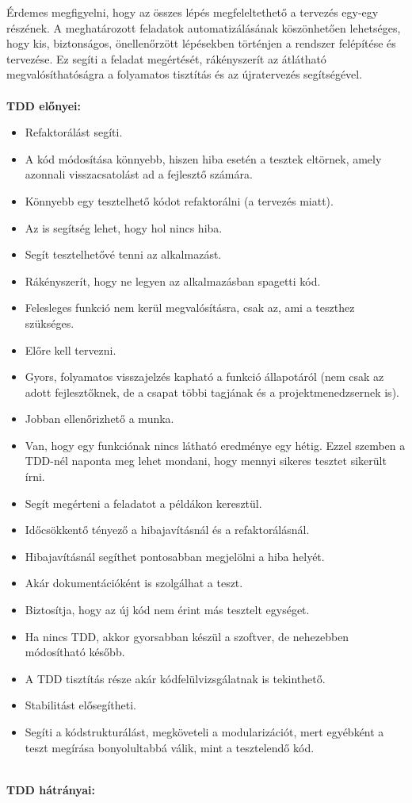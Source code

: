 Érdemes megfigyelni, hogy az összes lépés megfeleltethető a tervezés egy-egy részének. A meghatározott feladatok automatizálásának köszönhetően lehetséges, hogy kis, biztonságos, önellenőrzött lépésekben történjen a rendszer felépítése és tervezése. Ez segíti a feladat megértését, rákényszerít az átlátható megvalósíthatóságra a folyamatos tisztítás és az újratervezés segítségével.\\
\hfill\\
\textbf{TDD előnyei:}

\begin{itemize}
\item Refaktorálást segíti.
\item A kód módosítása könnyebb, hiszen hiba esetén a tesztek eltörnek, amely azonnali visszacsatolást ad a fejlesztő számára.
\item Könnyebb egy tesztelhető kódot refaktorálni (a tervezés miatt).
\item Az is segítség lehet, hogy hol nincs hiba.
\item Segít tesztelhetővé tenni az alkalmazást.
\item Rákényszerít, hogy ne legyen az alkalmazásban spagetti kód.
\item Felesleges funkció nem kerül megvalósításra, csak az, ami a teszthez szükséges.
\item Előre kell tervezni.
\item Gyors, folyamatos visszajelzés kapható a funkció állapotáról (nem csak az adott fejlesztőknek, de a csapat többi tagjának és a projektmenedzsernek is).
\item Jobban ellenőrizhető a munka.
\item Van, hogy egy funkciónak nincs látható eredménye egy hétig. Ezzel szemben a TDD-nél naponta meg lehet mondani, hogy mennyi sikeres tesztet sikerült írni.
\item Segít megérteni a feladatot a példákon keresztül.
\item Időcsökkentő tényező a hibajavításnál és a refaktorálásnál.
\item Hibajavításnál segíthet pontosabban megjelölni a hiba helyét.
\item Akár dokumentációként is szolgálhat a teszt.
\item Biztosítja, hogy az új kód nem érint más tesztelt egységet.
\item Ha nincs TDD, akkor gyorsabban készül a szoftver, de nehezebben módosítható később.
\item A TDD tisztítás része akár kódfelülvizsgálatnak is tekinthető.
\item Stabilitást elősegítheti.
\item Segíti a kódstrukturálást, megköveteli a modularizációt, mert egyébként a teszt megírása bonyolultabbá válik, mint a tesztelendő kód.
\end{itemize}
\hfill\\
\textbf{TDD hátrányai:}

